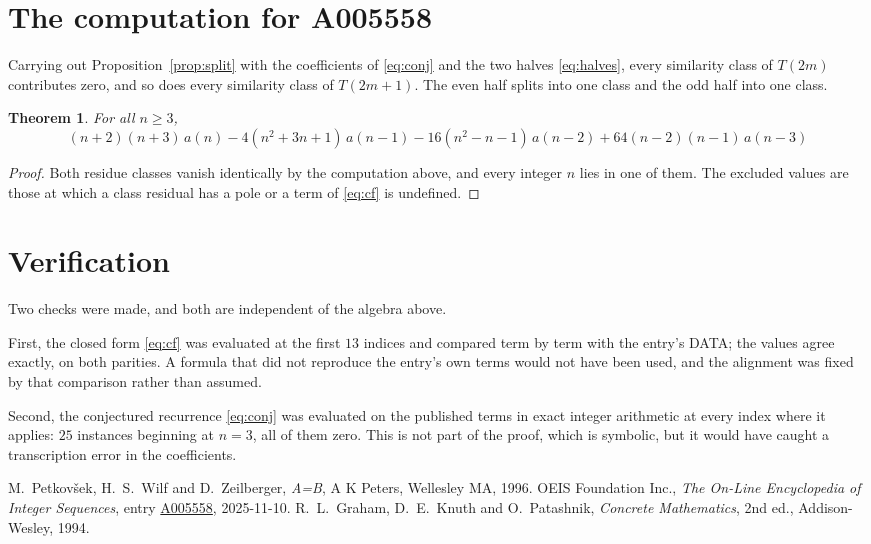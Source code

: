 \documentclass[11pt,a4paper]{article}
\theoremstyle{plain}
\newtheorem{theorem}{Theorem}
\theoremstyle{definition}
\begin{document}
\section{The computation for A005558}

Carrying out Proposition~\ref{prop:split} with the coefficients of \eqref{eq:conj} and the
two halves \eqref{eq:halves}, every similarity class of $T(2m)$ contributes zero, and so
does every similarity class of $T(2m+1)$. The even half splits into one class
and the odd half into one class.

\begin{theorem}
For all $n\ge 3$,
\[
\left(n + 2\right) \left(n + 3\right)\,a(n) -  4 \left(n^{2} + 3 n + 1\right)\,a(n-1) -  16 \left(n^{2} - n - 1\right)\,a(n-2) + 64 \left(n - 2\right) \left(n - 1\right)\,a(n-3)
\]
\end{theorem}

\begin{proof}
Both residue classes vanish identically by the computation above, and every integer $n$
lies in one of them. The excluded values are those at which a class residual has a pole or
a term of \eqref{eq:cf} is undefined.
\end{proof}

\section{Verification}

Two checks were made, and both are independent of the algebra above.

First, the closed form \eqref{eq:cf} was evaluated at the first $13$ indices and
compared term by term with the entry's DATA; the values agree exactly, on both parities. A
formula that did not reproduce the entry's own terms would not have been used, and the
alignment was fixed by that comparison rather than assumed.

Second, the conjectured recurrence \eqref{eq:conj} was evaluated on the published terms in
exact integer arithmetic at every index where it applies: $25$ instances beginning at
$n=3$, all of them zero. This is not part of the proof, which is symbolic, but it
would have caught a transcription error in the coefficients.

\begin{thebibliography}{9}
 M.~Petkov\v{s}ek, H.~S.~Wilf and D.~Zeilberger, \emph{A=B}, A K Peters,
Wellesley MA, 1996.
 OEIS Foundation Inc., \emph{The On-Line Encyclopedia of Integer Sequences},
entry \href{https://oeis.org/A005558}{A005558}, 2025-11-10.
 R.~L.~Graham, D.~E.~Knuth and O.~Patashnik, \emph{Concrete Mathematics},
2nd ed., Addison-Wesley, 1994.
\end{thebibliography}
\end{document}
